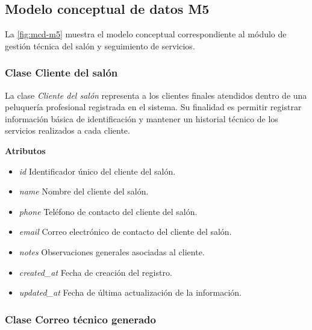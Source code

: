 \subsection{Modelo conceptual de datos M5}

La \autoref{fig:mcd-m5} muestra el modelo conceptual correspondiente al módulo de gestión técnica del salón y seguimiento de servicios.


\subsubsection{Clase Cliente del salón}

La clase \textit{Cliente del salón} representa a los clientes finales atendidos dentro de una peluquería profesional registrada en el sistema. Su finalidad es permitir registrar información básica de identificación y mantener un historial técnico de los servicios realizados a cada cliente.

\textbf{Atributos}

\begin{itemize}

      \item \textit{id}
            Identificador único del cliente del salón.
      \item \textit{name}
            Nombre del cliente del salón.
      \item \textit{phone}
            Teléfono de contacto del cliente del salón.
      \item \textit{email}
            Correo electrónico de contacto del cliente del salón.
      \item \textit{notes}
            Observaciones generales asociadas al cliente.
      \item \textit{created\_at}
            Fecha de creación del registro.
      \item \textit{updated\_at}
            Fecha de última actualización de la información.

\end{itemize}

\subsubsection{Clase Correo técnico generado}

